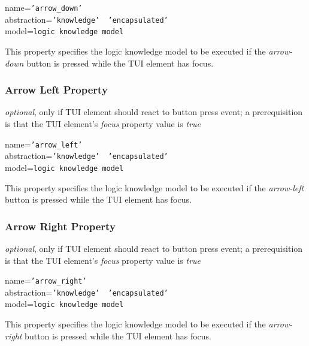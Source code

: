 name=\texttt{'arrow\_down'}\\
abstraction=\texttt{'knowledge' \vline\ 'encapsulated'}\\
model=\texttt{logic knowledge model}

This property specifies the logic knowledge model to be executed if the
\emph{arrow-down} button is pressed while the TUI element has focus.

\subsubsection{Arrow Left Property}

\emph{optional}, only if TUI element should react to button press event;
a prerequisition is that the TUI element's \emph{focus} property value is \emph{true}

name=\texttt{'arrow\_left'}\\
abstraction=\texttt{'knowledge' \vline\ 'encapsulated'}\\
model=\texttt{logic knowledge model}

This property specifies the logic knowledge model to be executed if the
\emph{arrow-left} button is pressed while the TUI element has focus.

\subsubsection{Arrow Right Property}

\emph{optional}, only if TUI element should react to button press event;
a prerequisition is that the TUI element's \emph{focus} property value is \emph{true}

name=\texttt{'arrow\_right'}\\
abstraction=\texttt{'knowledge' \vline\ 'encapsulated'}\\
model=\texttt{logic knowledge model}

This property specifies the logic knowledge model to be executed if the
\emph{arrow-right} button is pressed while the TUI element has focus.
